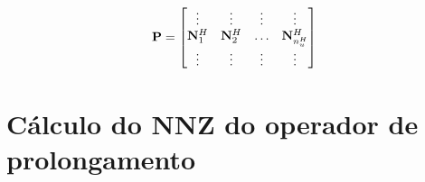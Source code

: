 \begin{equation}\label{eq:pronlogamento}
 \mathbf{P} =\begin{bmatrix}
\vdots                    & \vdots                      & \vdots & \vdots   \\ 
 \basefunctioncoarse[1]      & \basefunctioncoarse[2]         & \hdots & \basefunctioncoarse[\qtdfreedomcoarse] \\ 
\vdots                    & \vdots                      & \vdots & \vdots 
\end{bmatrix}
\end{equation}











\section{Cálculo do NNZ do operador de prolongamento}\label{sec:complexProlong}

